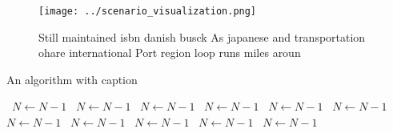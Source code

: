 \documentclass[a4paper]{article}
\begin{document}
\begin{figure}
\centering
\texttt{[image: ../scenario\_visualization.png]}
\caption{Still maintained isbn danish busck As japanese and transportation ohare international Port region loop runs miles aroun
}
\end{figure}
 
\begin{algorithm}
\caption{An algorithm with caption}
\begin{algorithmic}
\    \State $N \gets N - 1$
\    \State $N \gets N - 1$
\    \State $N \gets N - 1$
\    \State $N \gets N - 1$
\    \State $N \gets N - 1$
\    \State $N \gets N - 1$
\    \State $N \gets N - 1$
\    \State $N \gets N - 1$
\    \State $N \gets N - 1$
\    \State $N \gets N - 1$
\    \State $N \gets N - 1$
\EndWhile
\end{algorithmic}
\end{algorithm}
\end{document}
